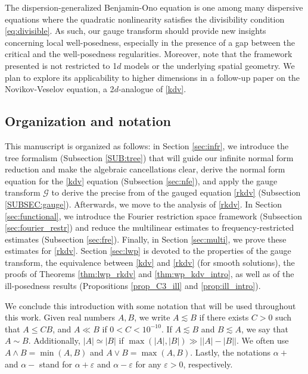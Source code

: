 \documentclass[a4paper,
11pt,  reqno]{amsart}
\newcommand{\5}{\textup{V}}
\newcommand{\les}{\lesssim}
\newcommand{\eps}{\varepsilon}
\theoremstyle{remark}
\newcommand{\al}{\alpha}
\newcommand{\Gc}{\mathcal{G}}
\numberwithin{equation}{section}
\numberwithin{theorem}{section}
\begin{document}
\bigskip

The dispersion-generalized Benjamin-Ono equation is one among many dispersive equations where the quadratic nonlinearity satisfies the divisibility condition \eqref{eq:divisible}. As such, our gauge transform should provide new insights concerning local well-posedness, especially in the presence of a gap between the critical and the well-posedness regularities. 
Moreover, note that the framework presented is not restricted to 1$d$ models or the underlying spatial geometry. 
We plan to explore its applicability to higher dimensions in a follow-up paper \cite{CCR-NV} on the Novikov-Veselov equation, a 2$d$-analogue of \eqref{kdv}. 




\subsection{Organization and notation} This manuscript is organized as follows: in Section \ref{sec:infr}, we introduce the tree formalism (Subsection \ref{SUB:tree}) that will guide our infinite normal form reduction and make the algebraic cancellations clear, derive the normal form equation for the \eqref{kdv} equation (Subsection \ref{sec:nfe}), and apply the gauge transform $\Gc$ to derive the precise from of the gauged equation \ref{rkdv} (Subsection \ref{SUBSEC:gauge}).
Afterwards, we move to the analysis of \eqref{rkdv}. In Section \ref{sec:functional}, we introduce the Fourier restriction space framework (Subsection \ref{sec:fourier_restr}) and reduce the multilinear estimates to frequency-restricted estimates (Subsection \ref{sec:fre}). Finally, in Section \ref{sec:multi}, we prove these estimates for \eqref{rkdv}. Section \ref{sec:lwp} is devoted to the properties of the gauge transform, the equivalence between \eqref{kdv} and \eqref{rkdv} (for smooth solutions), the proofs of Theorems \ref{thm:lwp_rkdv} and \ref{thm:wp_kdv_intro}, as well as of the ill-posedness results (Propositions \ref{prop_C3_ill} and \ref{prop:ill_intro}).

\bigskip

We conclude this introduction with some notation that will be used throughout this work. Given real numbers $A,B$, we write $A \les B$ if there exists $C>0$ such that $A \le CB$, and $A \ll B$ if $0<C< 10^{-10}$. If $A\les B$ and $B\les A$, we say that $A\sim B$. Additionally, $|A| \simeq |B|$ if $\max(|A|,|B|) \gg \big| |A| - |B| \big|$. 
We often use $A \land B = \min(A,B)$ and $A \lor B = \max(A,B)$. 
Lastly, 
the notations $\al +$ and $\al-$ stand for $\al+\eps$ and $\al-\eps$ for any $\eps>0$, respectively. 
\end{document}
